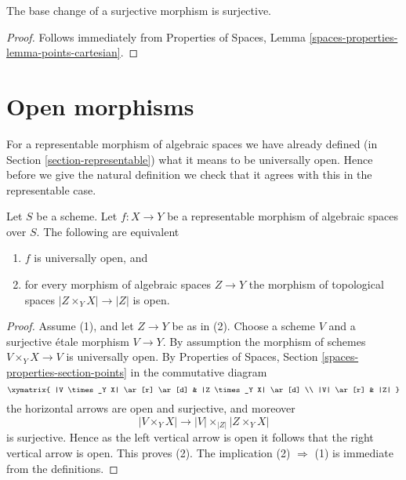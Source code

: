 \begin{lemma}
\label{lemma-base-change-surjective}
The base change of a surjective morphism is surjective.
\end{lemma}

\begin{proof}
Follows immediately from
Properties of Spaces, Lemma \ref{spaces-properties-lemma-points-cartesian}.
\end{proof}










\section{Open morphisms}
\label{section-open}

\noindent
For a representable morphism of algebraic spaces we have already defined (in
Section \ref{section-representable})
what it means to be universally open. Hence before we give the natural
definition we check that it agrees with this in the representable case.

\begin{lemma}
\label{lemma-characterize-representable-universally-open}
Let $S$ be a scheme. Let $f : X \to Y$ be a representable morphism of
algebraic spaces over $S$. The following are equivalent
\begin{enumerate}
\item $f$ is universally open, and
\item for every morphism of algebraic spaces $Z \to Y$ the morphism of
topological spaces $|Z \times_Y X| \to |Z|$ is open.
\end{enumerate}
\end{lemma}

\begin{proof}
Assume (1), and let $Z \to Y$ be as in (2). Choose a scheme $V$ and
a surjective \'etale morphism $V \to Y$. By assumption the morphism
of schemes $V \times_Y X \to V$ is universally open. By
Properties of Spaces, Section \ref{spaces-properties-section-points}
in the commutative diagram
$$
\xymatrix{
|V \times_Y X| \ar[r] \ar[d] & |Z \times_Y X| \ar[d] \\
|V| \ar[r] & |Z|
}
$$
the horizontal arrows are open and surjective, and moreover
$$
|V \times_Y X| \longrightarrow |V| \times_{|Z|} |Z \times_Y X|
$$
is surjective. Hence as the left
vertical arrow is open it follows that the right vertical arrow is
open. This proves (2). The implication (2) $\Rightarrow$ (1) is
immediate from the definitions.
\end{proof}

